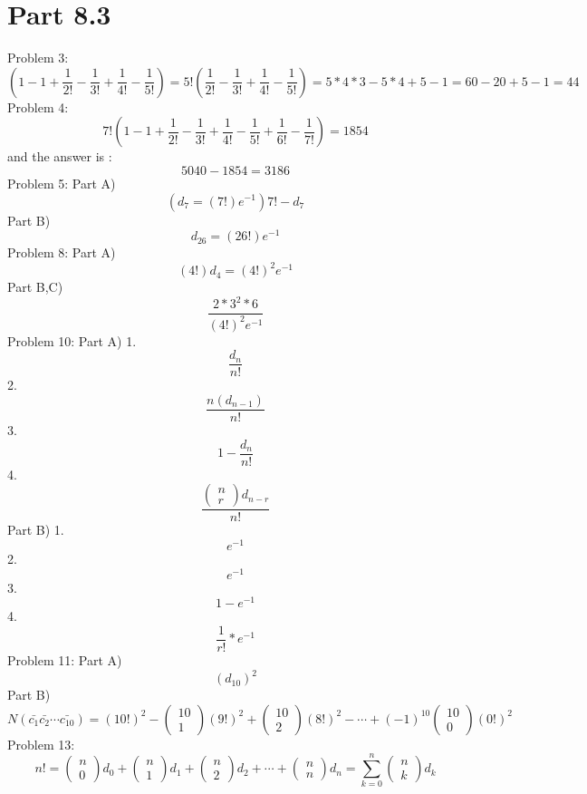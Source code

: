 \documentclass{article}
\begin{document}
\section{Part 8.3}
Problem 3:
$$
\left(
1-1+
\frac{1}{2!}
-
\frac{1}{3!}
+
\frac{1}{4!}
-
\frac{1}{5!}
\right)
=
5!
\left(
\frac{1}{2!}
-
\frac{1}{3!}
+
\frac{1}{4!}
-
\frac{1}{5!}
\right)
=
5*4*3
-
5*4
+
5
-
1
=
60-20+5-1=44
$$
Problem 4:
$$
7!
\left(
1-1+
\frac{1}{2!}
-
\frac{1}{3!}
+
\frac{1}{4!}
-
\frac{1}{5!}
+
\frac{1}{6!}
-
\frac{1}{7!}
\right)
=1854
$$
and the answer is :
$$
5040-1854=3186
$$
Problem 5: Part A)
$$
(d_7=(7!)e^{-1})7!-d_7
$$
Part B)
$$
d_{26}
=
(26!)e^{-1}
$$
Problem 8: Part A)
$$
(4!)d_4=(4!)^2e^{-1}
$$
Part B,C)
$$
\frac{2*3^2*6}{(4!)^2e^{-1}}
$$
Problem 10: Part A) 1.
$$
\frac{d_n}{n!}
$$
2.
$$
\frac{n(d_{n-1})}{n!}
$$
3.
$$
1-\frac{d_n}{n!}
$$
4.
$$
\frac{\left(\begin{array}{c}
n\\
r
\end{array}\right)
d_{n-r}}{n!}
$$
Part B) 1.
$$
e^{-1}
$$
2.
$$
e^{-1}
$$
3.
$$
1-e^{-1}
$$
4.
$$
\frac{1}{r!}
*e^{-1}
$$
Problem 11: Part A)
$$
(d_10)^2
$$
Part B)
$$
N(\bar{c_1}\bar{c_2}\cdots\bar{c_{10}})
=
(10!)^2
-
\left(\begin{array}{c}
10\\
1
\end{array}\right)
(9!)^2
+
\left(\begin{array}{c}
10\\
2
\end{array}\right)
(8!)^2
-
\cdots
+
(-1)^{10}
\left(\begin{array}{c}
10\\
0
\end{array}\right)
(0!)^2
$$
Problem 13:
$$
n!
=
\left(\begin{array}{c}
n\\
0
\end{array}\right)
d_0
+
\left(\begin{array}{c}
n\\
1
\end{array}\right)
d_1
+
\left(\begin{array}{c}
n\\
2
\end{array}\right)
d_2
+
\cdots
+
\left(\begin{array}{c}
n\\
n
\end{array}\right)
d_n
=
\sum_{k=0}^{n}
\left(\begin{array}{c}
n\\
k
\end{array}\right)
d_k
$$
\end{document}
